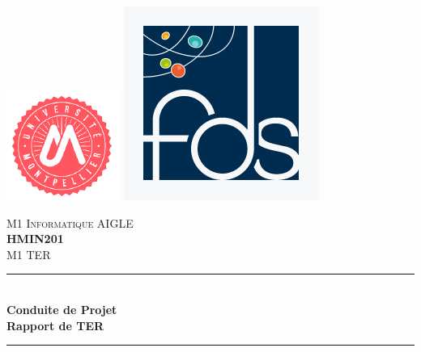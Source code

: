 \documentclass[12pt,a4paper]{report}
\begin{document}
\begin{titlepage}
\newcommand{\HRule}{\rule{\linewidth}{0.5mm}} %
\center

\includegraphics[scale=0.5]{images/umLogo.png} %
\hspace{\fill}
\includegraphics[scale=0.25]{images/fdsLogo.jpg} %

\textsc{\LARGE M1 Informatique AIGLE}\\[1cm]
\textsc{\Large \textbf{HMIN201}}\\[0.25cm]
\textsc{\large M1 TER}\\[0.5cm]

\HRule \\[0.4cm]
{ \huge \bfseries Conduite de Projet}\\[0.4cm]
{ \Large \bfseries Rapport de TER}\\[0.4cm]
\HRule \\[0.5cm]


\end{titlepage}
\end{document}
